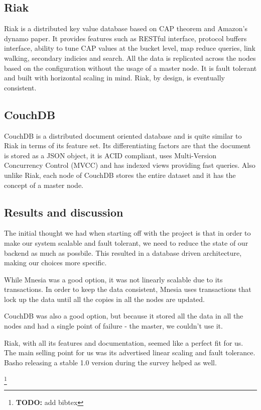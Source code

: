 \documentclass[11pt,a4paper]{report}
\newcommand{\todo}[1]{\footnote{{\color{red} {\bf TODO:} #1}}}
\begin{document}
\subsection{Riak}
Riak is a distributed key value database based on CAP theorem\cite{cap_theorem} and Amazon's dynamo paper\cite{dynamo}. It provides features such as RESTful interface, protocol buffers interface, ability to tune CAP values at the bucket level, map reduce queries, link walking, secondary indicies and search. All the data is replicated across the nodes based on the configuration without the usage of a master node. It is fault tolerant and built with horizontal scaling in mind. Riak, by design, is eventually consistent.

\subsection{CouchDB}
CouchDB is a distributed document oriented database and is quite similar to Riak in terms of its feature set. Its differentiating factors are that the document is stored as a JSON object, it is ACID compliant, uses Multi-Version Concurrency Control (MVCC) and has indexed views providing fast queries. Also unlike Riak, each node of CouchDB stores the entire dataset and it has the concept of a master node.

\subsection{Results and discussion}
The initial thought we had when starting off with the project is that in order to make our system scalable and fault tolerant, we need to reduce the state of our backend as much as possbile. This resulted in a database driven architecture, making our choices more specific.

While Mnesia was a good option, it was not linearly scalable due to its transactions. In order to keep the data consistent, Mnesia uses transactions that lock up the data until all the copies in all the nodes are updated.

CouchDB was also a good option, but because it stored all the data in all the nodes and had a single point of failure - the master, we couldn't use it.

Riak, with all its features and documentation, seemed like a perfect fit for us. The main selling point for us was its advertised linear scaling and fault tolerance. Basho releasing a stable 1.0 version during the survey helped as well.

\renewcommand\bibname{References}


\todo{add bibtex}
\end{document}

